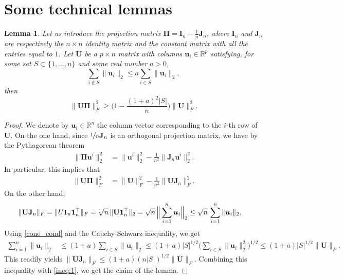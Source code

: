 \documentclass[sts,preprint,reqno,a4paper]{imsart}
\def\RR{\mathbb R}
\def\bfU{\mathbf U}
\def\bfI{\mathbf I}
\def\bfJ{\mathbf J}
\def\bfPi{\mathbf\Pi}
\def\bu{\boldsymbol u}
\theoremstyle{plain}
\newtheorem{lemma}{Lemma}
\theoremstyle{remark}
\theoremstyle{definition}
\begin{document}
\section{Some technical lemmas}\label{section_proofs2}

\begin{lemma}\label{lemme_Pi}
	Let us introduce the projection matrix $\bfPi = \bfI_n - \frac1n \bfJ_n$, where $\bfI_n$ and $\bfJ_n$ are respectively the $n\times n$ identity matrix and
    the constant matrix with all the entries equal to $1$.
    Let $\bfU$ be a $p\times n$ matrix with columns $\bu_i\in\RR^p$ satisfying, for some set $S\subset \{1,\ldots,n\}$ and some real number $a>0$,
	\begin{equation}\label{cone_cond}
		\sum_{i\not\in S} \|\bu_i\|_2 \le a \sum_{i\in S} \|\bu_i\|_2,
	\end{equation}
	then
	\begin{equation}
		\|\bfU\bfPi\|_F^2 \ge \Big( 1 - \frac{(1+a)^2|S|}{n} \Big) \|\bfU\|_F^2.
	\end{equation}
\end{lemma}

\begin{proof}
	We denote by $\bu_i\in\RR^n$ the column vector corresponding to the $i$-th row of $\bfU$.
    On the one hand, since $\nicefrac1n\bfJ_n$ is an orthogonal projection matrix, we have by the Pythagorean theorem
	\begin{align}
		\|\bfPi\bu^i\|_2^2 &= \|\bu^i\|_2^2 -\frac1{n^2} \|\bfJ_n\bu^i\|_2^2.
	\end{align}
    In particular, this implies that
	\begin{align}\label{ineq:1}
		\|\bfU\bfPi\|_F^2 &= \|\bfU\|_F^2 -\frac1{n^2} \|\bfU\bfJ_n\|_F^2.
	\end{align}
	On the other hand,
	\begin{align}
		\|\bfU\bfJ_n\|_F &= \|\mathbf \bfU 1_n\mathbf 1_n^\top\|_F =\sqrt{n}\, \|\bfU \mathbf 1_n^\top\|_2 = \sqrt{n}\, \Big\|\sum_{i=1}^n \bu_i\Big\|_2
        \le \sqrt{n}\, \sum_{i=1}^n \|\bu_i\|_2.
	\end{align}
    Using \eqref{cone_cond} and the Cauchy-Schwarz inequality, we get
	\begin{align}
		\sum_{i=1}^n \|\bu_i\|_2 &\le (1+a)\sum_{i\in S} \|\bu_i\|_2 \le (1+a)|S|^{1/2}\Big(\sum_{i\in S} \|\bu_i\|^2_2\Big)^{1/2} \le (1+a)|S|^{1/2}\|\bfU\|_F.
	\end{align}
    This readily yields $\|\bfU\bfJ_n\|_F \le (1+a) (n|S|)^{1/2}\|\bfU\|_F$. Combining this inequality with \eqref{ineq:1}, we get the claim of the lemma.
\end{proof}
\end{document}
